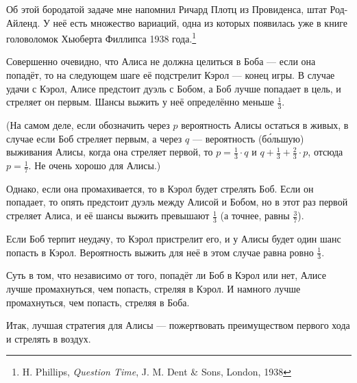 Об этой бородатой задаче мне напомнил Ричард Плотц из Провиденса, штат Род-Айленд.
У неё есть множество вариаций, одна из которых появилась уже в книге головоломок Хьюберта Филлипса 1938 года.\footnote{H. Phillips, \emph{Question Time},  J. M. Dent \& Sons, London, 1938}

\medskip

Совершенно очевидно, что Алиса не должна целиться в Боба --- если она попадёт, то на следующем шаге её подстрелит Кэрол --- конец игры.
В случае удачи с Кэрол, Алисе предстоит дуэль с Бобом, а Боб лучше попадает в цель, и стреляет он первым.
Шансы выжить у неё определённо меньше $\tfrac13$.

(На самом деле, если обозначить через $p$ вероятность Алисы остаться в живых, в случае если Боб стреляет первым, а через $q$ --- вероятность (б\'{о}льшую) выживания Алисы, когда она стреляет первой, то $p=\tfrac13\cdot q$ и $q+\tfrac13+\tfrac23\cdot p$, отсюда $p=\tfrac17$.
Не очень хорошо для Алисы.)

Однако, если она промахивается, то в Кэрол будет стрелять Боб.
Если он попадает, то опять предстоит дуэль между Алисой и Бобом, но в этот раз первой стреляет Алиса, и её шансы выжить превышают $\tfrac13$ (а точнее, равны $\tfrac37$).

Если Боб терпит неудачу, то Кэрол пристрелит его, и у Алисы будет один шанс попасть в Кэрол.
Вероятность выжить для неё в этом случае равна ровно $\tfrac13$.

Суть в том, что независимо от того, попадёт ли Боб в Кэрол или нет, Алисе лучше промахнуться, чем попасть, стреляя в Кэрол.
И намного лучше промахнуться, чем попасть, стреляя в Боба.

Итак, лучшая стратегия для Алисы --- пожертвовать преимуществом первого хода и стрелять в воздух.

\medskip

